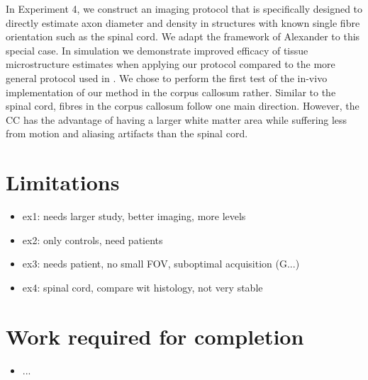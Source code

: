 In Experiment 4, we construct an imaging protocol that is specifically designed to directly estimate axon diameter and density in structures with known single fibre orientation such as the spinal cord. We adapt the framework of Alexander\cite{alexander08} to this special case. In simulation we demonstrate improved efficacy of tissue microstructure estimates when applying our protocol compared to the more general protocol used in \cite{alexander10}. We chose to perform the first test of the in-vivo implementation of our method  in the corpus callosum rather. Similar to the spinal cord, fibres in the corpus callosum follow one main direction. However, the CC has the advantage of having a larger white matter area while suffering less from motion and aliasing artifacts than the spinal cord.

\section{Limitations} 
\begin{itemize}
	\item ex1: needs larger study, better imaging, more levels
	\item ex2: only controls, need patients
	\item ex3: needs patient, no small FOV, suboptimal acquisition (G...)
	\item ex4: spinal cord, compare wit histology, not very stable 
\end{itemize}

\section{Work required for completion}
\begin{itemize}
	\item ...
\end{itemize}